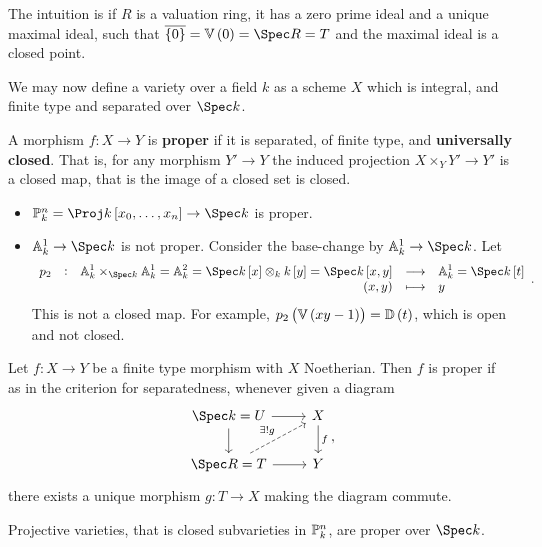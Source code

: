 
The intuition is if $ R $ is a valuation ring, it has a zero prime ideal and a unique maximal ideal, such that $ \overline{\cbr{0}} = \VV\br{0} = \Spec R = T $ and the maximal ideal is a closed point.

\begin{remark*}
We may now define a variety over a field $ k $ as a scheme $ X $ which is integral, and finite type and separated over $ \Spec k $.
\end{remark*}

\begin{definition*}
A morphism $ f : X \to Y $ is \textbf{proper} if it is separated, of finite type, and \textbf{universally closed}. That is, for any morphism $ Y' \to Y $ the induced projection $ X \times_Y Y' \to Y' $ is a closed map, that is the image of a closed set is closed.
\end{definition*}

\begin{example*}
\hfill
\begin{itemize}
\item $ \PP_k^n = \Proj k\sbr{x_0, \dots, x_n} \to \Spec k $ is proper.
\item $ \AA_k^1 \to \Spec k $ is not proper. Consider the base-change by $ \AA_k^1 \to \Spec k $. Let
$$ \function[p_2]{\AA_k^1 \times_{\Spec k} \AA_k^1 = \AA_k^2 = \Spec k\sbr{x} \otimes_k k\sbr{y} = \Spec k\sbr{x, y}}{\AA_k^1 = \Spec k\sbr{t}}{\br{x, y}}{y}. $$
This is not a closed map. For example, $ p_2\br{\VV\br{xy - 1}} = \DD\br{t} $, which is open and not closed.
\end{itemize}
\end{example*}

\begin{theorem}
Let $ f : X \to Y $ be a finite type morphism with $ X $ Noetherian. Then $ f $ is proper if as in the criterion for separatedness, whenever given a diagram
$$
\begin{tikzcd}
\Spec k = U \arrow{r} \arrow{d} & X \arrow{d}{f} \\
\Spec R = T \arrow[dashed]{ur}{\exists !g} \arrow{r} & Y
\end{tikzcd},
$$
there exists a unique morphism $ g : T \to X $ making the diagram commute.
\end{theorem}

\begin{example*}
Projective varieties, that is closed subvarieties in $ \mathbb{P}_k^n $, are proper over $ \Spec k $.
\end{example*}

